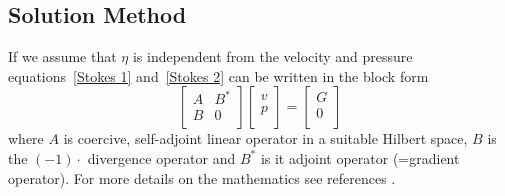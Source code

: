 \subsection{Solution Method \label{STOKES SOLVE}}
If we assume that $\eta$ is independent from the velocity and pressure equations~\ref{Stokes 1} and~\ref{Stokes 2} 
can be written in the block form
\begin{equation}
\left[ \begin{array}{cc}
A     & B^{*} \\
B & 0 \\
\end{array} \right]
\left[ \begin{array}{c}
v \\
p \\
\end{array} \right]
=\left[ \begin{array}{c}
G \\
0 \\
\end{array} \right]
\label{SADDLEPOINT}
\end{equation}
where $A$ is coercive, self-adjoint linear operator in a suitable Hilbert space, $B$ is the $(-1) \cdot$ divergence operator and $B^{*}$ is it adjoint operator (=gradient operator).
For more details on the mathematics see references \cite{AAMIRBERKYAN2008,MBENZI2005}. 

